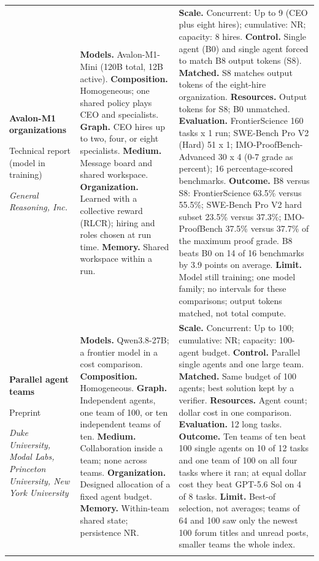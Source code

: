 \begin{longtable}{@{}>{\raggedright\arraybackslash}p{}>{\raggedright\arraybackslash}p{}>{\raggedright\arraybackslash}p{}@{}}
\textbf{Avalon-M1 organizations}\par \citep{avalon-m1}\par Technical report (model in training)\par\emph{General Reasoning, Inc.} & \textbf{Models.} Avalon-M1-Mini (120B total, 12B active). \textbf{Composition.} Homogeneous; one shared policy plays CEO and specialists. \textbf{Graph.} CEO hires up to two, four, or eight specialists. \textbf{Medium.} Message board and shared workspace. \textbf{Organization.} Learned with a collective reward (RLCR); hiring and roles chosen at run time. \textbf{Memory.} Shared workspace within a run. & \textbf{Scale.} Concurrent: Up to 9 (CEO plus eight hires); cumulative: NR; capacity: 8 hires. \textbf{Control.} Single agent (B0) and single agent forced to match B8 output tokens (S8). \textbf{Matched.} S8 matches output tokens of the eight-hire organization. \textbf{Resources.} Output tokens for S8; B0 unmatched. \textbf{Evaluation.} FrontierScience 160 tasks x 1 run; SWE-Bench Pro V2 (Hard) 51 x 1; IMO-ProofBench-Advanced 30 x 4 (0-7 grade as percent); 16 percentage-scored benchmarks. \textbf{Outcome.} B8 versus S8: FrontierScience 63.5\% versus 55.5\%; SWE-Bench Pro V2 hard subset 23.5\% versus 37.3\%; IMO-ProofBench 37.5\% versus 37.7\% of the maximum proof grade. B8 beats B0 on 14 of 16 benchmarks by 3.9 points on average. \textbf{Limit.} Model still training; one model family; no intervals for these comparisons; output tokens matched, not total compute. \\ \addlinespace[5pt]
\textbf{Parallel agent teams}\par \citep{parallel-agent-teams}\par Preprint\par\emph{Duke University, Modal Labs, Princeton University, New York University} & \textbf{Models.} Qwen3.8-27B; a frontier model in a cost comparison. \textbf{Composition.} Homogeneous. \textbf{Graph.} Independent agents, one team of 100, or ten independent teams of ten. \textbf{Medium.} Collaboration inside a team; none across teams. \textbf{Organization.} Designed allocation of a fixed agent budget. \textbf{Memory.} Within-team shared state; persistence NR. & \textbf{Scale.} Concurrent: Up to 100; cumulative: NR; capacity: 100-agent budget. \textbf{Control.} Parallel single agents and one large team. \textbf{Matched.} Same budget of 100 agents; best solution kept by a verifier. \textbf{Resources.} Agent count; dollar cost in one comparison. \textbf{Evaluation.} 12 long tasks. \textbf{Outcome.} Ten teams of ten beat 100 single agents on 10 of 12 tasks and one team of 100 on all four tasks where it ran; at equal dollar cost they beat GPT-5.6 Sol on 4 of 8 tasks. \textbf{Limit.} Best-of selection, not averages; teams of 64 and 100 saw only the newest 100 forum titles and unread posts, smaller teams the whole index. \\ \addlinespace[5pt]

\end{longtable}
